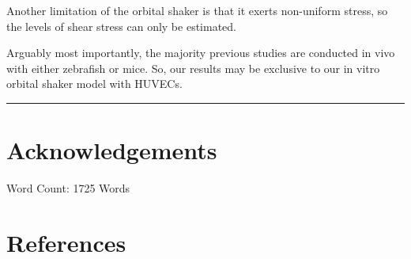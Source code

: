 \documentclass[
  11pt,
]{article}
\begin{document}
Another limitation of the orbital shaker is that it exerts non-uniform stress, so the levels of shear stress can only be estimated.

Arguably most importantly, the majority previous studies are conducted in vivo with either zebrafish or mice.
So, our results may be exclusive to our in vitro orbital shaker model with HUVECs.

\begin{center}\rule{0.5\linewidth}{0.5pt}\end{center}

\hypertarget{acknowledgements}{%
\section{Acknowledgements}\label{acknowledgements}}

\begin{flushright}
Word Count: 1725 Words
\end{flushright}

\hypertarget{references}{%
\section{References}\label{references}}

\small
\end{document}

